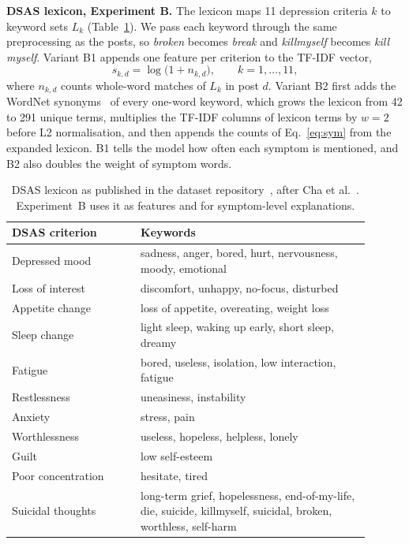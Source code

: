 \documentclass[conference]{IEEEtran}
\begin{document}
\textbf{DSAS lexicon, Experiment B.} The lexicon maps 11 depression criteria $k$ to keyword sets $L_k$ (Table~\ref{tab:dsas}). We pass each keyword through the same preprocessing as the posts, so \textit{broken} becomes \textit{break} and \textit{killmyself} becomes \textit{kill myself}. Variant B1 appends one feature per criterion to the TF-IDF vector,
\begin{equation}
s_{k,d}=\log\big(1+n_{k,d}\big),\qquad k=1,\dots,11,
\label{eq:sym}
\end{equation}
where $n_{k,d}$ counts whole-word matches of $L_k$ in post $d$. Variant B2 first adds the WordNet synonyms~\cite{miller1995wordnet} of every one-word keyword, which grows the lexicon from 42 to 291 unique terms, multiplies the TF-IDF columns of lexicon terms by $w=2$ before L2 normalisation, and then appends the counts of Eq.~\eqref{eq:sym} from the expanded lexicon. B1 tells the model how often each symptom is mentioned, and B2 also doubles the weight of symptom words.

\begin{table}[!htbp]
\centering
\caption{DSAS lexicon as published in the dataset repository~\cite{kuas2023dataset}, after Cha et al.~\cite{cha2022lexicon}. Experiment~B uses it as features and for symptom-level explanations.}
\label{tab:dsas}
\footnotesize
\begin{tabular}{p{0.32\linewidth}p{0.58\linewidth}}
\toprule
DSAS criterion & Keywords \\
\midrule
Depressed mood & sadness, anger, bored, hurt, nervousness, moody, emotional \\
Loss of interest & discomfort, unhappy, no-focus, disturbed \\
Appetite change & loss of appetite, overeating, weight loss \\
Sleep change & light sleep, waking up early, short sleep, dreamy \\
Fatigue & bored, useless, isolation, low interaction, fatigue \\
Restlessness & uneasiness, instability \\
Anxiety & stress, pain \\
Worthlessness & useless, hopeless, helpless, lonely \\
Guilt & low self-esteem \\
Poor concentration & hesitate, tired \\
Suicidal thoughts & long-term grief, hopelessness, end-of-my-life, die, suicide, killmyself, suicidal, broken, worthless, self-harm \\
\bottomrule
\end{tabular}
\end{table}
\end{document}
